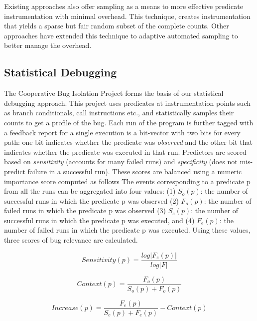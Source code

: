 Existing approaches also offer sampling as a means to more effective predicate instrumentation with minimal overhead.
This technique, creates instrumentation that yields a sparse but fair random subset of the complete counts.
Other approaches have extended this technique to adaptive automated sampling to better manage the overhead.

\subsection{Statistical Debugging}
\label{sec:Statistical Debugging}


The Cooperative Bug Isolation Project forms the basis of our statistical debugging approach.
This project uses predicates at instrumentation points such as branch conditionals, call instructions etc., and statistically samples their counts to get a profile of the bug.
Each run of the program is further tagged with a feedback report for a single execution is a bit-vector with two bits for every path: one bit indicates whether the predicate was \emph{observed} and the other bit that indicates whether the predicate was executed in that run.
Predictors are scored based on \emph{sensitivity} (accounts for many failed runs) and \emph{specificity} (does not mis-predict failure in a successful run).
These scores are balanced using a numeric importance score computed as follows
The events corresponding to a predicate p from all the runs can be aggregated into four values: (1) $S_{o}(p)$: the number of successful runs in which the predicate p was observed (2) $F_{o}(p)$: the number of failed runs in which the predicate  p was observed (3) $S_{e}(p)$: the number of successful runs in which the predicate p was executed, and (4) $F_{e}(p)$: the number of failed runs in which the predicate p was executed.
Using these values, three scores of bug relevance are calculated.

\begin{equation}
\label{eq:sensitivity}
Sensitivity(p) = \frac{log|F_{e}(p)|}{log|F|}
\end{equation}

\begin{equation}
\label{eq:context}
Context(p) = \frac{F_{o}(p)}{S_{o}(p) + F_{o}(p)}
\end{equation}

\begin{equation}
\label{eq:increase}
Increase(p) = \frac{F_{e}(p)}{S_{e}(p) + F_{e}(p)} - Context(p)
\end{equation}

